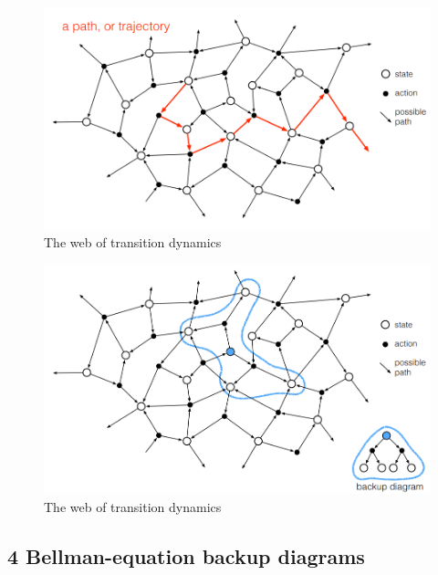 \begin{figure}[!htb]
\centering
\includegraphics[scale=0.7]{pix/web-transition-dynamics.png}
\caption{The web of transition dynamics}
\end{figure}


\begin{figure}[!htb]
\centering
\includegraphics[scale=0.7]{pix/web2-transition-dynamics.png}
\caption{The web of transition dynamics}
\end{figure}


\subsection{4 Bellman-equation backup diagrams}

